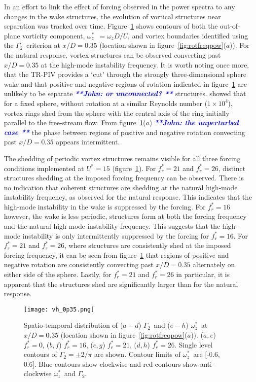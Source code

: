 \documentclass[3p]{elsarticle}
\newcommand{\Ustar}{\ensuremath{U^{*}}}
\newcommand{\freqrat}{\ensuremath{f_r^*}}
\newcommand{\gtwo}{\ensuremath{\Gamma_2}}
\newcommand{\wz}{\ensuremath{\omega_z^*}}
\newcommand{\js}[1]{{\textcolor{blue}{{\bf{\it{ **John: #1 **}}}}}}
\begin{document}
In an effort to link the effect of forcing observed in the power
spectra to any changes in the wake structures, the evolution of
vortical structures near separation was tracked over time.
Figure~\ref{fig:vh_0p35} shows contours of both the out-of-plane
vorticity component, \wz~$=\omega_zD/U$, and vortex boundaries
identified using the \gtwo~criterion \citep{graftieaux2001} at
$x/D=0.35$ (location shown in figure~\ref{fig:rotfreqpow}($a$)). For
the natural response, vortex structures can be observed convecting
past $x/D=0.35$ at the high-mode instability frequency. It is worth
noting once more, that the TR-PIV provides a `cut' through the
strongly three-dimensional sphere wake and that positive and negative
regions of rotation indicated in figure~\ref{fig:vh_0p35} are unlikely
to be separate \js{ or unconnected?} structures. \citet{Yun2006} showed that for a fixed
sphere, without rotation at a similar Reynolds number
($1\times10^4$), vortex rings shed from the sphere with the central
axis of the ring initially parallel to the free-stream flow. From
figure~\ref{fig:vh_0p35}($a$) \js{the unperturbed case} the phase between regions of positive
and negative rotation convecting past $x/D=0.35$ appears intermittent.

The shedding of periodic vortex structures remains visible for all
three forcing conditions implemented at $\Ustar=15$
(figure~\ref{fig:vh_0p35}). For $\freqrat=21$ and
$\freqrat=26$, distinct structures shedding at the imposed forcing
frequency can be observed. There is no indication that coherent
structures are shedding at the natural high-mode instability
frequency, as observed for the natural response. This indicates that
the high-mode instability in the wake is suppressed by the forcing. For $\freqrat=16$ however, the wake is less periodic,
structures form at both the forcing frequency and the natural
high-mode instability frequency. This suggests that the
high-mode instability is only intermittently suppressed by the forcing
for $\freqrat=16$. For
$\freqrat=21$ and $\freqrat=26$, where structures are consistently
shed at the imposed forcing frequency, it can be seen from
figure~\ref{fig:vh_0p35} that regions of positive and negative
rotation are consistently convecting past $x/D=0.35$ alternately on either side
of the sphere. Lastly, for $\freqrat=21$ and $\freqrat=26$ in particular, it is apparent that the structures shed
are significantly larger than for the natural response.
%
\begin{figure}
	\centering
	\texttt{[image: vh\_0p35.png]}
	\caption{Spatio-temporal distribution of ($a-d$) \gtwo~and
		($e-h$) \wz~at $x/D=0.35$ (location shown in
		figure~\ref{fig:rotfreqpow}($a$)). ($a,e$)
		$\freqrat=0$, ($b,f$) $\freqrat=16$, ($c,g$)
		$\freqrat=21$, ($d,h$) $\freqrat=26$. Single level
		contours of $\gtwo= \pm 2/\pi$ are shown. Contour limits of
		\wz~are [-0.6, 0.6]. Blue contours show clockwise and red contours show anti-clockwise \wz~and \gtwo.}
	\label{fig:vh_0p35}
\end{figure}
%
\end{document}
